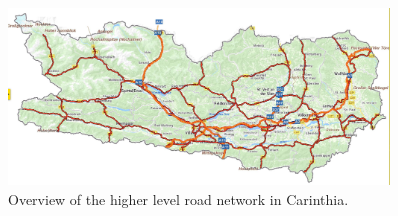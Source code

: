 \begin{figure}
 \centering
  \includegraphics[width=0.9\textwidth]{map.jpg}
  \caption{Overview of the higher level road network in Carinthia.}
  \label{fig:higher level}
\end{figure}
